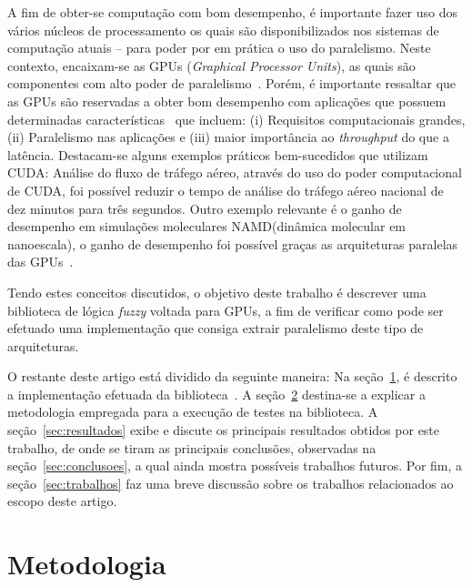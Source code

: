 \documentclass[12pt]{article}
\begin{document}
	A fim de obter-se computação com bom desempenho, é importante fazer uso dos vários núcleos de processamento os quais são disponibilizados nos sistemas de computação atuais -- para poder por em prática o uso do paralelismo. Neste contexto, encaixam-se as GPUs (\textit{Graphical Processor Units}), as quais são componentes com alto poder de paralelismo~\cite{sengupta:07}. Porém, é importante ressaltar que as GPUs são reservadas a obter bom desempenho com aplicações que possuem determinadas características~\cite{owens:08} que incluem: (i) Requisitos computacionais grandes, (ii) Paralelismo nas aplicações e (iii) maior importância ao \textit{throughput} do que a latência. Destacam-se alguns exemplos práticos bem-sucedidos que utilizam CUDA:
Análise do fluxo de tráfego aéreo, através do uso do poder computacional de CUDA, foi possível reduzir o tempo de análise do tráfego aéreo nacional
de dez minutos para três segundos. Outro exemplo relevante é o ganho de desempenho em simulações moleculares NAMD(dinâmica molecular em nanoescala), o ganho de desempenho foi possível graças as arquiteturas paralelas das GPUs~\cite{nvidia:15}.


	Tendo estes conceitos discutidos, o objetivo deste trabalho é descrever uma biblioteca de lógica \textit{fuzzy} voltada para GPUs, a fim de verificar como pode ser efetuado uma implementação que consiga extrair paralelismo deste tipo de arquiteturas.
	

	O restante deste artigo está dividido da seguinte maneira: Na seção~\ref{sec:lib}, é descrito a implementação efetuada da biblioteca~\libname. A seção~\ref{sec:metodologia} destina-se a explicar a metodologia empregada para a execução de testes na biblioteca. A seção~\ref{sec:resultados} exibe e discute os principais resultados obtidos por este trabalho, de onde se tiram as principais conclusões, observadas na seção~\ref{sec:conclusoes}, a qual ainda mostra possíveis trabalhos futuros. Por fim, a seção~\ref{sec:trabalhos} faz uma breve discussão sobre os trabalhos relacionados ao escopo deste artigo.
	
\section{\libname}
\label{sec:lib}

\section{Metodologia}
\label{sec:metodologia}	
\end{document}
